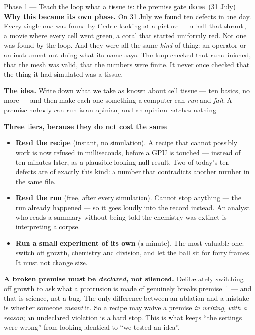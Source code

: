 \documentclass[11pt,a4paper]{article}
\newcommand{\dn}{\textcolor{good}{\textbf{done}}}
\begin{document}
\begin{phasebox}{Phase 1 --- Teach the loop what a tissue is: the premise gate \hfill \dn\ (31 July)}
\textbf{Why this became its own phase.} On 31 July we found ten defects in one day. Every single
one was found by Cedric looking at a picture --- a ball that shrank, a movie where every cell went
green, a coral that started uniformly red. Not one was found by the loop. And they were all the
same \emph{kind} of thing: an operator or an instrument not doing what its name says. The loop
checked that runs finished, that the mesh was valid, that the numbers were finite. It never once
checked that the thing it had simulated was a tissue.

\textbf{The idea.} Write down what we take as known about cell tissue --- ten basics, no more ---
and then make each one something a computer can \emph{run} and \emph{fail}. A premise nobody can
run is an opinion, and an opinion catches nothing.

\textbf{Three tiers, because they do not cost the same}
\begin{itemize}
\item \textbf{Read the recipe} (instant, no simulation). A recipe that cannot possibly work is now
refused in milliseconds, before a GPU is touched --- instead of ten minutes later, as a
plausible-looking null result. Two of today's ten defects are of exactly this kind: a number that
contradicts another number in the same file.
\item \textbf{Read the run} (free, after every simulation). Cannot stop anything --- the run
already happened --- so it goes loudly into the record instead. An analyst who reads a summary
without being told the chemistry was extinct is interpreting a corpse.
\item \textbf{Run a small experiment of its own} (a minute). The most valuable one: switch off
growth, chemistry and division, and let the ball sit for forty frames. It must not change size.
\end{itemize}

\textbf{A broken premise must be \emph{declared}, not silenced.} Deliberately switching off growth
to ask what a protrusion is made of genuinely breaks premise~1 --- and that is science, not a bug.
The only difference between an ablation and a mistake is whether someone \emph{meant} it. So a
recipe may waive a premise \emph{in writing, with a reason}; an undeclared violation is a hard
stop. This is what keeps ``the settings were wrong'' from looking identical to ``we tested an
idea''.


\end{phasebox}
\end{document}
